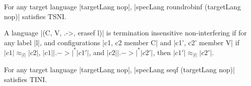 \begin{theorem}
For any target language |targetLang nop|, |specLang roundrobinf
(targetLang nop)| satisfies TSNI.
\end{theorem}

\begin{definition}
  A language |(C, V, .->, erasef l)| is termination
  insensitive non-interfering if for any label |l|, and configurations
  |c1, c2 member C| and |c1', c2' member V| if
   $|c1| \approx_{|l|} |c2|$,
   $|c1| |.->|^* |c1'|$, and
   $|c2| |.->|^* |c2'|$, then
   $|c1'| \approx_{|l|} |c2'|$.
\end{definition}


\begin{theorem}
For any target language |targetLang nop|, |specLang seqf (targetLang
nop)| satisfies TINI.
\end{theorem}




